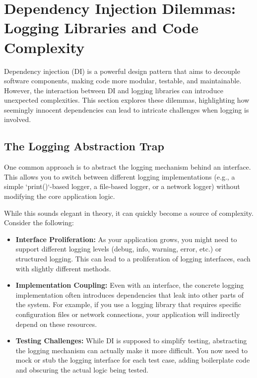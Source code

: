 \documentclass{article}
\begin{document}
{{{{\section*{Dependency Injection Dilemmas: Logging Libraries and Code Complexity}

Dependency injection (DI) is a powerful design pattern that aims to decouple software components, making code more modular, testable, and maintainable. However, the interaction between DI and logging libraries can introduce unexpected complexities. This section explores these dilemmas, highlighting how seemingly innocent dependencies can lead to intricate challenges when logging is involved.

\subsection*{The Logging Abstraction Trap}

One common approach is to abstract the logging mechanism behind an interface. This allows you to switch between different logging implementations (e.g., a simple `print()`-based logger, a file-based logger, or a network logger) without modifying the core application logic.

While this sounds elegant in theory, it can quickly become a source of complexity. Consider the following:

\begin{itemize}
    \item \textbf{Interface Proliferation:}  As your application grows, you might need to support different logging levels (debug, info, warning, error, etc.) or structured logging.  This can lead to a proliferation of logging interfaces, each with slightly different methods.
    \item \textbf{Implementation Coupling:} Even with an interface, the concrete logging implementation often introduces dependencies that leak into other parts of the system. For example, if you use a logging library that requires specific configuration files or network connections, your application will indirectly depend on these resources.
    \item \textbf{Testing Challenges:}  While DI is supposed to simplify testing, abstracting the logging mechanism can actually make it more difficult.  You now need to mock or stub the logging interface for each test case, adding boilerplate code and obscuring the actual logic being tested.
\end{itemize}

}}}}
\end{document}
